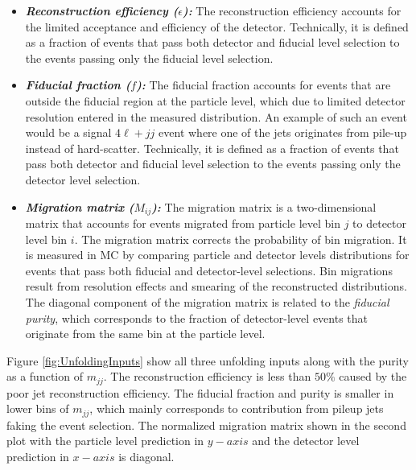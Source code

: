 \begin{itemize}
    \item{\textit{\textbf{Reconstruction efficiency ($\epsilon$):}} The reconstruction efficiency accounts for the limited acceptance and efficiency of the detector. Technically, it is defined as a fraction of events that pass both detector and fiducial level selection to the events passing only the fiducial level selection. }
    
    \item{\textit{\textbf{Fiducial fraction ($f$):}} The fiducial fraction accounts for events that are outside the fiducial region at the particle level, which due to limited detector resolution entered in the measured distribution. An example of such an event would be a signal $4\ell+jj$ event where one of the jets originates from pile-up instead of hard-scatter. Technically, it is defined as a fraction of events that pass both detector and fiducial level selection to the events passing only the detector level selection. }
    
    \item{\textit{\textbf{Migration matrix ($M_{ij}$):}} The migration matrix is a two-dimensional matrix that accounts for events migrated from particle level bin $j$ to detector level bin $i$. The migration matrix corrects the probability of bin migration. It is measured in MC by comparing particle and detector levels distributions for events that pass both fiducial and detector-level selections. Bin migrations result from resolution effects and smearing of the reconstructed distributions. The diagonal component of the migration matrix is related to the \textit{fiducial purity}, which corresponds to the fraction of detector-level events that originate from the same bin at the particle level.}
\end{itemize}

Figure \ref{fig:UnfoldingInputs} show all three unfolding inputs along with the purity as a function of $m_{jj}$. The reconstruction efficiency is less than $50\%$ caused by the poor jet reconstruction efficiency. The fiducial fraction and purity is smaller in lower bins of $m_{jj}$, which mainly corresponds to contribution from pileup jets faking the event selection. The normalized migration matrix shown in the second plot with the particle level prediction in $y-axis$ and the detector level prediction in $x-axis$ is diagonal.

